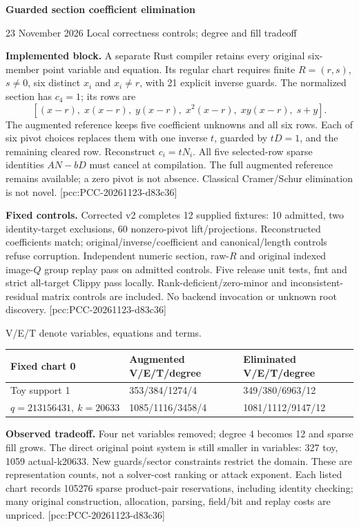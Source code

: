 \documentclass[10pt]{article}
\begin{document}
{\Large\bfseries\color{ink} Guarded section coefficient elimination}\par
{\small 23 November 2026 \quad Local correctness controls; degree and fill tradeoff}

\textbf{Implemented block.} A separate Rust compiler retains every original
six-member point variable and equation. Its regular chart requires finite
$R=(r,s)$, $s\ne0$, six distinct $x_i$ and $x_i\ne r$, with 21 explicit inverse
guards. The normalized section has $c_4=1$; its rows are
\[
[(x-r),\;x(x-r),\;y(x-r),\;x^2(x-r),\;xy(x-r),\;s+y].
\]
The augmented reference keeps five coefficient unknowns and all six rows.
Each of six pivot choices replaces them with one inverse $t$, guarded by
$tD=1$, and the remaining cleared row. Reconstruct $c_i=tN_i$. All five
selected-row sparse identities $AN-bD$ must cancel at compilation. The full
augmented reference remains available; a zero pivot is not absence.
Classical Cramer/Schur elimination is not novel. [pcc:PCC-20261123-d83c36]

\textbf{Fixed controls.} Corrected v2 completes 12 supplied fixtures: 10 admitted,
two identity-target exclusions, 60 nonzero-pivot lift/projections. Reconstructed
coefficients match; original/inverse/coefficient and canonical/length controls
refuse corruption. Independent numeric section, raw-$R$ and original indexed
image-$Q$ group replay pass on admitted controls. Five release unit tests,
fmt and strict all-target Clippy pass locally. Rank-deficient/zero-minor and
inconsistent-residual matrix controls are included. No backend invocation or
unknown root discovery. [pcc:PCC-20261123-d83c36]

V/E/T denote variables, equations and terms.
\begin{center}
\begin{tabular}{lll}
\toprule Fixed chart 0 & Augmented V/E/T/degree & Eliminated V/E/T/degree\\\midrule
Toy support 1 &353/384/1274/4&349/380/6963/12\\
$q=213156431,\ k=20633$ &1085/1116/3458/4&1081/1112/9147/12\\\bottomrule
\end{tabular}
\end{center}
\textbf{Observed tradeoff.} Four net variables removed; degree 4 becomes 12 and
sparse fill grows. The direct original point system is still smaller in
variables: 327 toy, 1059 actual-k20633. New guards/sector constraints restrict the
domain. These are representation counts, not a solver-cost ranking or attack
exponent. Each listed chart records 105276 sparse product-pair reservations,
including identity checking; many original construction, allocation, parsing,
field/bit and replay costs are unpriced. [pcc:PCC-20261123-d83c36]
\end{document}
